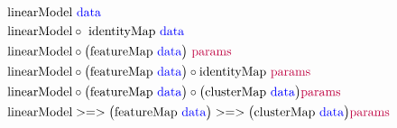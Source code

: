 \begin{align*} 
& \textrm{linearModel} \ \textcolor{blue}{\text{data}} \\
& \textrm{linearModel} \circ \ \textrm{identityMap} \ \textcolor{blue}{\text{data}} \\ 
& \textrm{linearModel} \circ  \big(\textrm{featureMap} \ \textcolor{blue}{\text{data}}\big) \ \textcolor{purple}{\text{params}} \\ 
& \textrm{linearModel} \circ  \big(\textrm{featureMap} \ \textcolor{blue}{\text{data}}\big) \circ \textrm{identityMap} \  \textcolor{purple}{\text{params}} \\ 
& \textrm{linearModel} \circ  \big(\textrm{featureMap} \ \textcolor{blue}{\text{data}}\big) \circ \big(\textrm{clusterMap} \ \textcolor{blue}{\text{data}}\big)  \textcolor{purple}{\text{params}} \\ 
& \textrm{linearModel} >=>  \big(\textrm{featureMap} \ \textcolor{blue}{\text{data}}\big) >=> \big(\textrm{clusterMap} \ \textcolor{blue}{\text{data}}\big)  \textcolor{purple}{\text{params}} \\ 
\end{align*}
